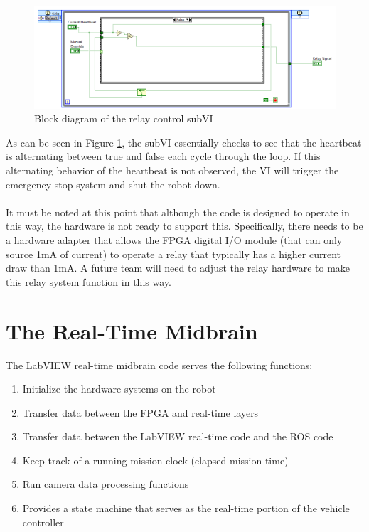 \begin{figure}[h!]
\centering
\includegraphics[scale=0.55]{Photos/relaycontrolsubvi.png}
\caption{Block diagram of the relay control subVI}
\label{fig:relaycontrolsubvi}
\end{figure}

\noindent As can be seen in Figure \ref{fig:relaycontrolsubvi}, the subVI essentially checks to see that the heartbeat is alternating between true and false each cycle through the loop. If this alternating behavior of the heartbeat is not observed, the VI will trigger the emergency stop system and shut the robot down.\\ \\
%
It must be noted at this point that although the code is designed to operate in this way, the hardware is not ready to support this. Specifically, there needs to be a hardware adapter that allows the FPGA digital I/O module (that can only source 1mA of current) to operate a relay that typically has a higher current draw than 1mA. A future team will need to adjust the relay hardware to make this relay system function in this way. 

\newpage

\section{The Real-Time Midbrain}

The LabVIEW real-time midbrain code serves the following functions:

\begin{enumerate}
\item Initialize the hardware systems on the robot
\item Transfer data between the FPGA and real-time layers
\item Transfer data between the LabVIEW real-time code and the ROS code
\item Keep track of a running mission clock (elapsed mission time)
\item Run camera data processing functions
\item Provides a state machine that serves as the real-time portion of the vehicle controller
\end{enumerate}

